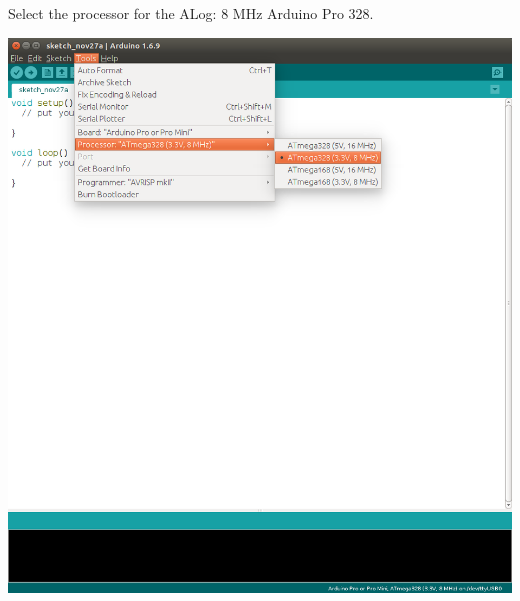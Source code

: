 \begin{DoxyEnumerate}
\item Select the processor for the A\+Log\+: 8 M\+Hz Arduino Pro 328.  
\begin{DoxyImage}
\includegraphics[width=.8\linewidth]{ProcessorSelect_3V3_8MHz.png}
\caption{The Arduino Pro or Pro Mini (3.3V, 8 M\+Hz) w/ A\+Tmega328 has the proper settings for the A\+Log Bottle\+Logger. Your version of Arduino won’t have the \textquotesingle{}A\+Log Bottle\+Logger\textquotesingle{} custom setting at the top; it is part of our work to eventually have a more streamlined A\+Log programming interface.}
\end{DoxyImage}


\end{DoxyEnumerate}
